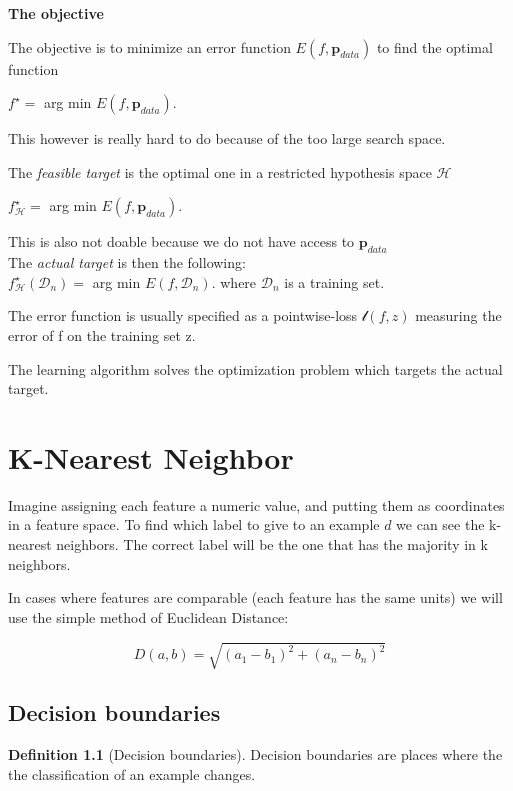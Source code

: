 \documentclass[oneside]{book}
\theoremstyle{definition}
\newtheorem{definition}{Definition}[section]
\begin{document}
\textbf{The objective}

The objective is to minimize an error function $E(f,\textbf{p}_{data})$ to find the optimal function 

$f^{\star} =$ arg min $E(f,\textbf{p}_{data}) $.

This however is really hard to do because of the too large search space. 

The \emph{feasible target} is the optimal one in a restricted hypothesis space $\mathscr{H}$

$f^{\star}_{\mathscr{H}} =$ arg min $E(f,\textbf{p}_{data}) $.

This is also not doable because we do not have access to $\textbf{p}_{data}$
\\
The \emph{actual target} is then the following: 
\\

$f^{\star}_{\mathscr{H}} (\mathscr{D}_n) =$ arg min $E(f, \mathscr{D}_n) $. where $\mathscr{D}_n$ is a training set. 

The error function is usually specified as a pointwise-loss $\mathscr{l}(f,z)$ measuring the error of f on the training set z. 

The learning algorithm solves the optimization problem which targets the actual target. 


\chapter{K-Nearest Neighbor}

Imagine assigning each feature a numeric value, and putting them as coordinates in a feature space. To find which label to give to an example $d$ we can see the k-nearest neighbors. The correct label will be the one that has the majority in k neighbors. 


In cases where features are comparable (each feature has the same units) we will use the simple method of Euclidean Distance: 

\[
D(a,b) = \sqrt{(a_1-b_1)^2+(a_n-b_n)^2}
\]

\section{Decision boundaries}

\begin{definition}[Decision boundaries]
	Decision boundaries are places where the the classification of an example changes.
\end{definition}
\end{document}
